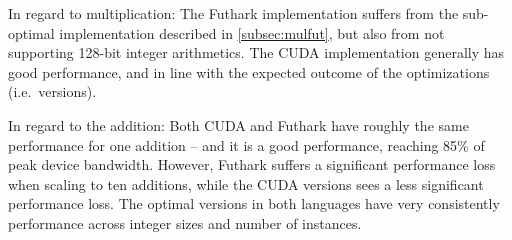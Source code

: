 In regard to multiplication: The Futhark implementation suffers from the
sub-optimal implementation described in \ref{subsec:mulfut}, but also from not
supporting 128-bit integer arithmetics. The CUDA implementation generally has
good performance, and in line with the expected outcome of the optimizations
(i.e.\ versions).

In regard to the addition: Both CUDA and Futhark have roughly the same
performance for one addition -- and it is a good performance, reaching 85\% of
peak device bandwidth. However, Futhark suffers a significant performance loss
when scaling to ten additions, while the CUDA versions sees a less significant
performance loss. The optimal versions in both languages have very consistently
performance across integer sizes and number of instances.


